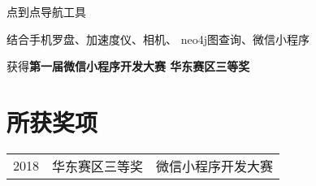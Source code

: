 \documentclass[]{deedy-resume-openfont}
\begin{document}
\begin{minipage}[t]{0.73\textwidth}
\sectionsep

\begin{tightemize}
    \item 点到点导航工具
    \item 结合手机罗盘、加速度仪、相机、 neo4j图查询、微信小程序
    \item 获得\textbf{第一届微信小程序开发大赛 华东赛区三等奖}
\end{tightemize}
\sectionsep




\section{所获奖项} 
\begin{tabular}{rll}
2018         & 华东赛区三等奖  & 微信小程序开发大赛 \\
\end{tabular}
\sectionsep


% 
% 

\end{minipage} 
\end{document}
